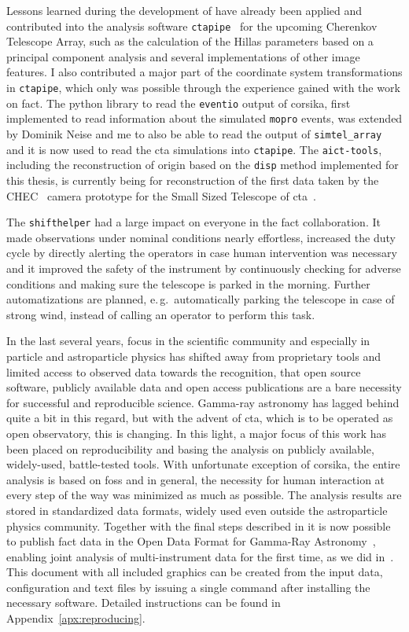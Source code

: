 Lessons learned during the development of \facttools{} have already been applied 
and contributed into the analysis software \texttt{ctapipe}~\cite{ctapipe,ctapipe-icrc} for
the upcoming Cherenkov Telescope Array, such as the calculation of the Hillas parameters
based on a principal component analysis and several implementations of other image features.
I also contributed a major part of the coordinate system transformations in \texttt{ctapipe},
which only was possible through the experience gained with the work on \gls{fact}.
The python library to read the \texttt{eventio} output of \gls{corsika},
first implemented to read information about the simulated \texttt{mopro} events,
was extended by Dominik Neise and me to also be able to read the output of \texttt{simtel\_array}
and it is now used to read the \gls{cta} simulations into \texttt{ctapipe}.
The \texttt{aict-tools}, including the reconstruction of origin based on the 
\texttt{disp} method implemented for this thesis,
is currently being for reconstruction of the first data taken by the CHEC~\cite{chec} camera prototype for the Small Sized Telescope of \gls{cta}~\cite{chec-talk}.

The \texttt{shifthelper} had a large impact on everyone in the 
\gls{fact} collaboration.
It made observations under nominal conditions nearly effortless, 
increased the duty cycle by directly alerting the operators in case
human intervention was necessary and it improved the safety of the instrument
by continuously checking for adverse conditions and making sure the telescope is parked in
the morning.
Further automatizations are planned, e.\,g.\ automatically parking the telescope
in case of strong wind, instead of calling an operator to perform this task.

In the last several years, focus in the scientific community and especially
in particle and astroparticle physics has shifted away from proprietary tools
and limited access to observed data towards the recognition, that 
open source software, publicly available data and open access publications
are a bare necessity for successful and reproducible science.
Gamma-ray astronomy has lagged behind quite a bit in this regard,
but with the advent of \gls{cta}, which is to be operated as open observatory, this is changing.
In this light, a major focus of this work has been placed on reproducibility and basing the analysis on publicly available, widely-used, battle-tested tools.
With unfortunate exception of \gls{corsika},
the entire analysis is based on \gls{foss} and in general,
the necessity for human interaction at every step of the way was minimized as much as possible.
The analysis results are stored in standardized data formats,
widely used even outside the astroparticle physics community.
Together with the final steps described in \cite{phd-bruegge} it is now possible to
publish \gls{fact} data in the Open Data Format for Gamma-Ray Astronomy~\cite{ogadf},
enabling joint analysis of multi-instrument data for the first time, as we did in~\cite{open-crab}.
This document with all included graphics can be created from the input data,
configuration and text files by issuing a single command after installing the necessary software.
Detailed instructions can be found in Appendix~\ref{apx:reproducing}.
